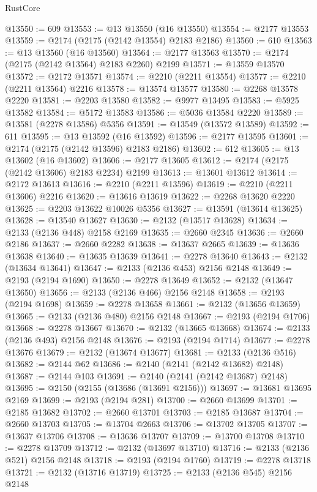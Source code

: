 \begin{lexlean}{RustCore}
\begin{coremodule}
@13550 := 609
@13553 := @13 @13550 (@16 @13550)
@13554 := @2177 @13553
@13559 := @2174 (@2175 (@2142 @13554) @2183 @2186)
@13560 := 610
@13563 := @13 @13560 (@16 @13560)
@13564 := @2177 @13563
@13570 := @2174 (@2175 (@2142 @13564) @2183 @2260) @2199
@13571 := @13559 @13570
@13572 := @2172 @13571
@13574 := @2210 (@2211 @13554)
@13577 := @2210 (@2211 @13564) @2216
@13578 := @13574 @13577
@13580 := @2268 @13578 @2220
@13581 := @2203 @13580
@13582 := @9977 @13495
@13583 := @5925 @13582
@13584 := @5172 @13583
@13586 := @5036 @13584 @2220
@13589 := @13581 (@2278 @13586) @5356
@13591 := @13549 (@13572 @13589)
@13592 := 611
@13595 := @13 @13592 (@16 @13592)
@13596 := @2177 @13595
@13601 := @2174 (@2175 (@2142 @13596) @2183 @2186)
@13602 := 612
@13605 := @13 @13602 (@16 @13602)
@13606 := @2177 @13605
@13612 := @2174 (@2175 (@2142 @13606) @2183 @2234) @2199
@13613 := @13601 @13612
@13614 := @2172 @13613
@13616 := @2210 (@2211 @13596)
@13619 := @2210 (@2211 @13606) @2216
@13620 := @13616 @13619
@13622 := @2268 @13620 @2220
@13625 := @2203 @13622 @10026 @5356
@13627 := @13591 (@13614 @13625)
@13628 := @13540 @13627
@13630 := @2132 (@13517 @13628)
@13634 := @2133 (@2136 @448) @2158 @2169
@13635 := @2660 @2345
@13636 := @2660 @2186
@13637 := @2660 @2282
@13638 := @13637 @2665
@13639 := @13636 @13638
@13640 := @13635 @13639
@13641 := @2278 @13640
@13643 := @2132 (@13634 @13641)
@13647 := @2133 (@2136 @453) @2156 @2148
@13649 := @2193 (@2194 @1690)
@13650 := @2278 @13649
@13652 := @2132 (@13647 @13650)
@13656 := @2133 (@2136 @466) @2156 @2148
@13658 := @2193 (@2194 @1698)
@13659 := @2278 @13658
@13661 := @2132 (@13656 @13659)
@13665 := @2133 (@2136 @480) @2156 @2148
@13667 := @2193 (@2194 @1706)
@13668 := @2278 @13667
@13670 := @2132 (@13665 @13668)
@13674 := @2133 (@2136 @493) @2156 @2148
@13676 := @2193 (@2194 @1714)
@13677 := @2278 @13676
@13679 := @2132 (@13674 @13677)
@13681 := @2133 (@2136 @516)
@13682 := @2144 @62
@13686 := @2140 (@2141 (@2142 @13682) @2148)
@13687 := @2144 @103
@13691 := @2140 (@2141 (@2142 @13687) @2148)
@13695 := @2150 (@2155 (@13686 (@13691 @2156)))
@13697 := @13681 @13695 @2169
@13699 := @2193 (@2194 @281)
@13700 := @2660 @13699
@13701 := @2185 @13682
@13702 := @2660 @13701
@13703 := @2185 @13687
@13704 := @2660 @13703
@13705 := @13704 @2663
@13706 := @13702 @13705
@13707 := @13637 @13706
@13708 := @13636 @13707
@13709 := @13700 @13708
@13710 := @2278 @13709
@13712 := @2132 (@13697 @13710)
@13716 := @2133 (@2136 @521) @2156 @2148
@13718 := @2193 (@2194 @1760)
@13719 := @2278 @13718
@13721 := @2132 (@13716 @13719)
@13725 := @2133 (@2136 @545) @2156 @2148

\end{coremodule}
\end{lexlean}
